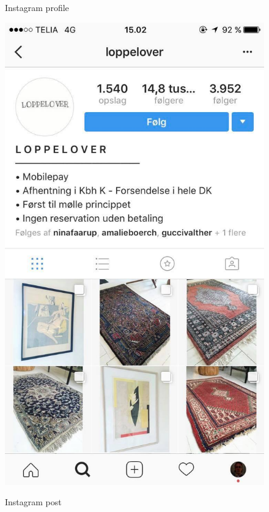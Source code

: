 \begin{figure}[H]
\begin{minipage}[b]{0.285\linewidth}
    \caption{\newline Instagram profile}
    \includegraphics[width=\linewidth]{Appendix/ScreenshotsCompetitorsPlatforms/Instaprofile.jpg}
    \label{InstaProfile}
  \end{minipage}
 \hspace{0.6cm}
  \begin{minipage}[b]{0.285\linewidth}
    \caption{\newline Instagram post}

\end{minipage}
\end{figure}
